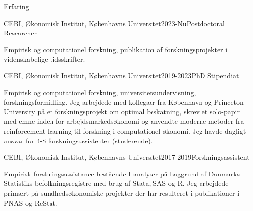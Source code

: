 \documentclass[
	10pt, %
]{resume} %
\begin{document}
\begin{rSection}{Erfaring}
    \begin{rSubsection}{CEBI, Økonomisk Institut, Københavns Universitet}{2023-Nu}{Postdoctoral Researcher}{}
        \item[] Empirisk og computationel forskning, publikation af forskningsprojekter i videnskabelige tidsskrifter.
    \end{rSubsection}

    \begin{rSubsection}{CEBI, Økonomisk Institut, Københavns Universitet}{2019-2023}{PhD Stipendiat}{}
        \item[] Empirisk og computationel forskning, universitetsundervisning, forskningsformidling. Jeg arbejdede med kollegaer fra København og Princeton University på et forskningsprojekt om optimal beskatning, skrev et solo-papir med emne inden for arbejdsmarkedsøkonomi og anvendte moderne metoder fra reinforcement learning til forskning i computationel økonomi. Jeg havde dagligt ansvar for 4-8 forskningsassistenter (studerende).
    \end{rSubsection}

    \begin{rSubsection}{CEBI, Økonomisk Institut, Københavns Universitet}{2017-2019}{Forskningsassistent}{}
        \item[] Empirisk forskningsassistance bestående I analyser på baggrund af Danmarks Statistiks befolkningsregistre med brug af Stata, SAS og R. Jeg arbejdede primært på sundhedsøkonomiske projekter der har resulteret i publikationer i PNAS og ReStat.
    \end{rSubsection}


\end{rSection}
\end{document}
